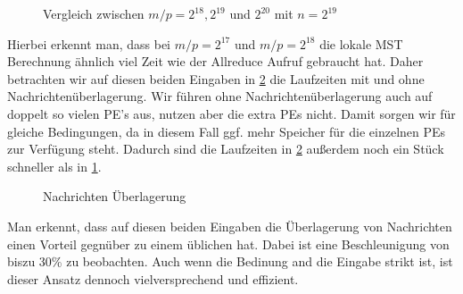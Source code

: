 \begin{figure}[H]
    \centering
    
    
    
    \caption{Vergleich zwischen $m/p= 2^{18},  2^{19}$ und $2^{20}$ mit $n=2^{19}$}
    \label{X-Img}
\end{figure}

Hierbei erkennt man, dass bei $m/p=2^{17}$ und $m/p=2^{18}$ die lokale MST Berechnung ähnlich viel Zeit wie der Allreduce Aufruf gebraucht hat. Daher betrachten wir auf diesen beiden Eingaben in \cref{Overlap-Img} die Laufzeiten \boruvkaAllreduce mit und ohne Nachrichtenüberlagerung. Wir führen \boruvkaAllreduce ohne Nachrichtenüberlagerung auch auf doppelt so vielen PE's aus, nutzen aber die extra PEs nicht. 
Damit sorgen wir für gleiche Bedingungen, da in diesem Fall ggf. mehr Speicher für die einzelnen PEs zur Verfügung steht. Dadurch sind die Laufzeiten in \cref{Overlap-Img} außerdem noch ein Stück schneller als in \cref{X-Img}.

\begin{figure}[H]
    \centering
    
     
    \caption{Nachrichten Überlagerung}
    \label{Overlap-Img}
\end{figure}

Man erkennt, dass auf diesen beiden Eingaben die Überlagerung von Nachrichten einen Vorteil gegnüber zu einem üblichen \boruvkaAllreduce hat. Dabei ist eine Beschleunigung von biszu 30\% zu beobachten. Auch wenn die Bedinung and die Eingabe strikt ist, ist dieser Ansatz dennoch vielversprechend und effizient.\\ 

